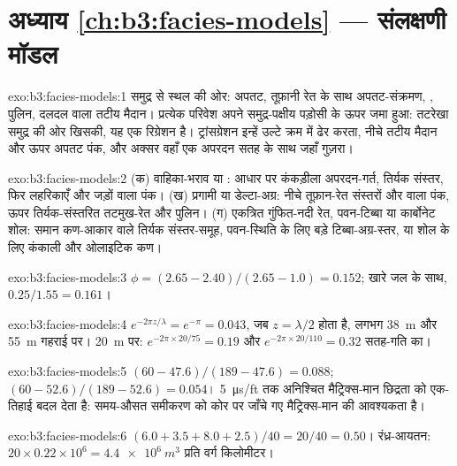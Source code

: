 \section*{अध्याय \ref{ch:b3:facies-models} --- संलक्षणी मॉडल}

\begin{solution}{exo:b3:facies-models:1}
समुद्र से स्थल की ओर: अपतट, तूफ़ानी रेत के साथ अपतट-संक्रमण,
, पुलिन, दलदल वाला तटीय मैदान। प्रत्येक परिवेश अपने समुद्र-पक्षीय
पड़ोसी के ऊपर जमा हुआ: तटरेखा समुद्र की ओर खिसकी, यह एक रिग्रेशन है।
ट्रांसग्रेशन इन्हें उल्टे क्रम में ढेर करता, नीचे तटीय मैदान और ऊपर
अपतट पंक, और अक्सर वहाँ एक अपरदन सतह के साथ जहाँ
 गुज़रा।
\end{solution}

\begin{solution}{exo:b3:facies-models:2}
(क) वाहिका-भराव या : आधार पर कंकड़ीला अपरदन-गर्त, तिर्यक संस्तर,
फिर लहरिकाएँ और जड़ों वाला पंक। (ख) प्रगामी  या डेल्टा-अग्र:
नीचे तूफ़ान-रेत संस्तरों और  वाला पंक,
ऊपर तिर्यक-संस्तरित तटमुख-रेत और पुलिन। (ग) एकत्रित गुंफित-नदी रेत, पवन-टिब्बा
या कार्बोनेट शोल: समान कण-आकार वाले तिर्यक संस्तर-समूह,
पवन-स्थिति के लिए बड़े टिब्बा-अग्र-स्तर, या शोल के लिए कंकाली और ओलाइटिक
कण।
\end{solution}

\begin{solution}{exo:b3:facies-models:3}
$\phi = (2.65 - 2.40)/(2.65 - 1.0) = 0.152$; खारे जल के साथ,
$0.25/1.55 = 0.161$।
\end{solution}

\begin{solution}{exo:b3:facies-models:4}
$e^{-2\pi z/\lambda} = e^{-\pi} = 0.043$, जब $z = \lambda/2$ होता है, लगभग
\qty{38}{m} और \qty{55}{m} गहराई पर। \qty{20}{m} पर: $e^{-2\pi\times20/75} = 0.19$
और $e^{-2\pi\times20/110} = 0.32$ सतह-गति का।
\end{solution}

\begin{solution}{exo:b3:facies-models:5}
$(60 - 47.6)/(189 - 47.6) = 0.088$; $(60 - 52.6)/(189 - 52.6) = 0.054$।
\qty{5}{\micro\second/ft} तक अनिश्चित मैट्रिक्स-मान छिद्रता को
एक-तिहाई बदल देता है: समय-औसत समीकरण को कोर पर जाँचे गए मैट्रिक्स-मान की आवश्यकता है।
\end{solution}

\begin{solution}{exo:b3:facies-models:6}
$(6.0 + 3.5 + 8.0 + 2.5)/40 = 20/40 = 0.50$। रंध्र-आयतन: $20\times0.22
\times10^6 = \qty{4.4e6}{m^3}$ प्रति वर्ग किलोमीटर।
\end{solution}

